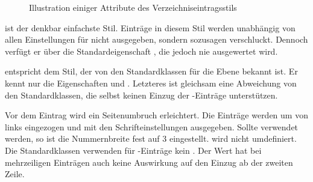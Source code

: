 \begin{description}
\begin{figure}
{%
    }
    \caption{Illustration einiger Attribute des Verzeichniseintragsstils
      }
    \label{fig:tocbasic.dottedtocline}
  \end{figure}
\item[\PValue{gobble}] ist der denkbar einfachste Stil. Einträge in diesem
  Stil werden unabhängig von allen Einstellungen für
  nicht ausgegeben, sondern sozusagen verschluckt. Dennoch verfügt er über die
  Standardeigenschaft , die jedoch nie ausgewertet wird.
\item[\PValue{largetocline}] entspricht dem Stil, der von den Standardklassen
  für die Ebene  bekannt ist. Er kennt
  nur die Eigenschaften
   und . Letzteres ist gleichsam eine Abweichung
  von den Standardklassen, die selbst keinen Einzug der -Einträge
  unterstützen.

  Vor dem Eintrag wird ein Seitenumbruch erleichtert. Die Einträge werden um
   von links eingezogen und mit den Schrifteinstellungen
   ausgegeben. Sollte
   verwendet werden, so ist die
  Nummernbreite fest auf 3
  eingestellt.  wird nicht umdefiniert. Die
  Standardklassen verwenden für -Einträge kein
  . Der Wert hat bei mehrzeiligen Einträgen
  auch keine Auswirkung auf den Einzug ab der zweiten Zeile.


\end{description}
